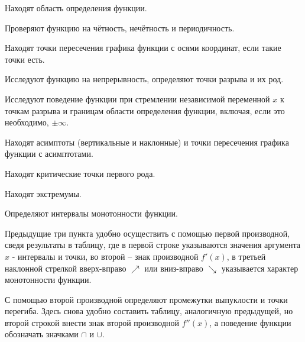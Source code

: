 \begin{list}{.}{}

\item Находят область определения функции.

\item Проверяют функцию на чётность, нечётность и периодичность.

\item Находят точки пересечения графика функции с осями координат, если такие точки есть.

\item Исследуют функцию на непрерывность, определяют точки разрыва и их род.

\item Исследуют поведение функции при стремлении независимой переменной $x$ к точкам разрыва и границам области определения функции, включая, если это необходимо, $\pm \infty$.

\item Находят асимптоты (вертикальные и наклонные) и точки пересечения графика функции с асимптотами.

\item Находят критические точки первого рода.

\item Находят экстремумы.

\item Определяют интервалы монотонности функции.

Предыдущие три пункта удобно осуществить с помощью первой производной, сведя результаты в таблицу, где в первой строке указываются значения аргумента $x$ - интервалы и точки, во второй -- знак производной $f'(x)$, в третьей наклонной стрелкой вверх-вправо $\nearrow$ или вниз-вправо $\searrow$ указывается характер монотонности функции.

\item С помощью второй производной определяют промежутки выпуклости и точки перегиба. Здесь снова удобно составить таблицу, аналогичную предыдущей, но второй строкой внести знак второй производной $f''(x)$, а поведение функции обозначать значками $\cap$ и $\cup$.

\end{list}

